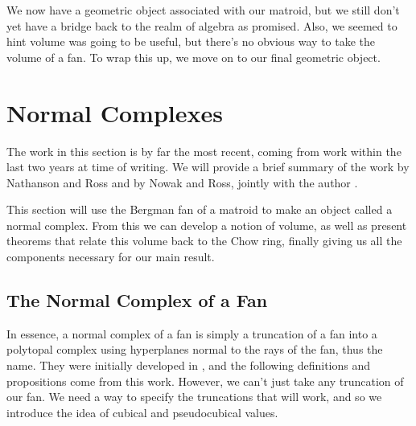 \documentclass[12pt,oneside]{../../sfsuthesis}
\begin{document}
We now have a geometric object associated with our matroid, but we still don't yet have a bridge back to the realm of algebra as promised.
Also, we seemed to hint volume was going to be useful, but there's no obvious way to take the volume of a fan.
To wrap this up, we move on to our final geometric object.

\section{Normal Complexes}
The work in this section is by far the most recent, coming from work within the last two years at time of writing.
We will provide a brief summary of the work by Nathanson and Ross \cite{nathansonTropicalFansNormal2023} and by Nowak and Ross, jointly with the author \cite{nowakMixedVolumesNormal2023}.

This section will use the Bergman fan of a matroid to make an object called a normal complex.
From this we can develop a notion of volume, as well as present theorems that relate this volume back to the Chow ring, finally giving us all the components necessary for our main result.

\subsection{The Normal Complex of a Fan}
In essence, a normal complex of a fan is simply a truncation of a fan into a polytopal complex using hyperplanes normal to the rays of the fan, thus the name.
They were initially developed in \cite{nathansonTropicalFansNormal2023}, and the following definitions and propositions come from this work.
However, we can't just take any truncation of our fan.
We need a way to specify the truncations that will work, and so we introduce the idea of cubical and pseudocubical values.
\end{document}
